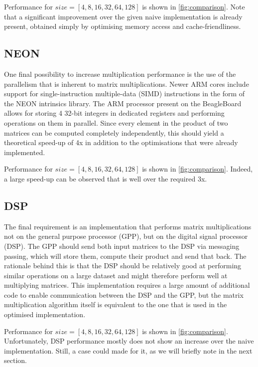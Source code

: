 \documentclass[final]{article}
\begin{document}
Performance for $size = [4, 8, 16, 32, 64, 128]$ is shown in \cref{fig:comparison}.
Note that a significant improvement over the given naive implementation is already present, obtained simply by optimising memory access and cache-friendliness.

\subsection{NEON}
One final possibility to increase multiplication performance is the use of the parallelism that is inherent to matrix multiplications.
Newer ARM cores include support for single-instruction multiple-data (SIMD) instructions in the form of the NEON intrinsics library.
The ARM processor present on the BeagleBoard allows for storing 4 32-bit integers in dedicated registers and performing operations on them in parallel.
Since every element in the product of two matrices can be computed completely independently, this should yield a theoretical speed-up of 4x in addition to the optimisations that were already implemented.

Performance for $size = [4, 8, 16, 32, 64, 128]$ is shown in \cref{fig:comparison}.
Indeed, a large speed-up can be observed that is well over the required 3x.

\subsection{DSP}
The final requirement is an implementation that performs matrix multiplications not on the general purpose processor (GPP), but on the digital signal processor (DSP).
The GPP should send both input matrices to the DSP via messaging passing, which will store them, compute their product and send that back.
The rationale behind this is that the DSP should be relatively good at performing similar operations on a large dataset and might therefore perform well at multiplying matrices.
This implementation requires a large amount of additional code to enable communication between the DSP and the GPP, but the matrix multiplication algorithm itself is equivalent to the one that is used in the optimised implementation.

Performance for $size = [4, 8, 16, 32, 64, 128]$ is shown in \cref{fig:comparison}.
Unfortunately, DSP performance mostly does not show an increase over the naive implementation. Still, a case could made for it, as we will briefly note in the next section.
\end{document}
